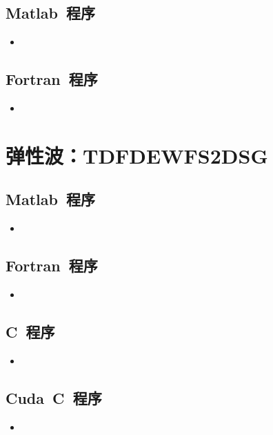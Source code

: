 \documentclass[UTF8]{ctexart}
\newcommand{\insertFcode}[2]{\begin{itemize}\item[]\end{itemize}}
\newcommand{\insertMcode}[2]{\begin{itemize}\item[]\end{itemize}}
\newcommand{\insertCcode}[2]{\begin{itemize}\item[]\end{itemize}}
\begin{document}
\subsection{Matlab~程序}
\insertMcode{./Code/TDFDAWFS2DSG.m}{}
\subsection{Fortran~程序}
\insertFcode{./Code/TDFDAWFS2DSG.f90}{}

\newpage
\section{弹性波：TDFDEWFS2DSG}
\subsection{Matlab~程序}
\insertMcode{./Code/TDFDEWFS2DSG.m}{}
\subsection{Fortran~程序}
\insertFcode{./Code/TDFDEWFS2DSG.f90}{}
\subsection{C~程序}
\insertCcode{./Code/TDFDEWFS2DSG.cpp}{}
\subsection{Cuda~C~程序}
\insertCcode{./Code/TDFDEWFS2DSG.cu}{}
\end{document}
